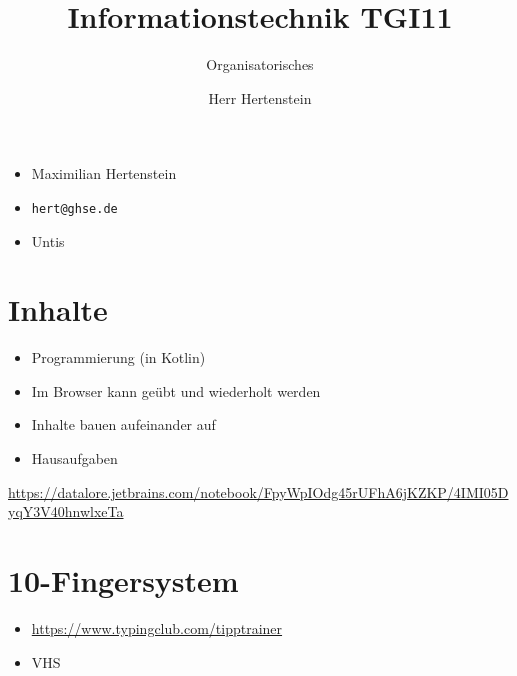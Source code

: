 \documentclass{beamer}
\title{Informationstechnik TGI11}
\subtitle{Organisatorisches}
\author{Herr Hertenstein}
\date{}
\begin{document}
    \begin{frame}
        \maketitle
    \end{frame}

\begin{frame}[plain]
\begin{itemize}
	\item Maximilian Hertenstein
	\item \texttt{hert@ghse.de}
	\item Untis
	\end{itemize}
	\end{frame}
	\section{Inhalte}
		\begin{frame}[plain]
	\begin{itemize}
	\item Programmierung (in Kotlin)
	\item Im Browser kann geübt und wiederholt werden
	\item Inhalte bauen aufeinander auf
	\item Hausaufgaben
	
	\end{itemize}
	\end{frame}
\begin{frame}[plain]
\url{https://datalore.jetbrains.com/notebook/FpyWpIOdg45rUFhA6jKZKP/4IMI05DyqY3V40hnwlxeTa}
\end{frame}



 \section{10-Fingersystem}
	\begin{frame}[plain]
\begin{itemize}
\item \url{https://www.typingclub.com/tipptrainer}

\item VHS
\end{itemize}

\end{frame}

 
\end{document}
